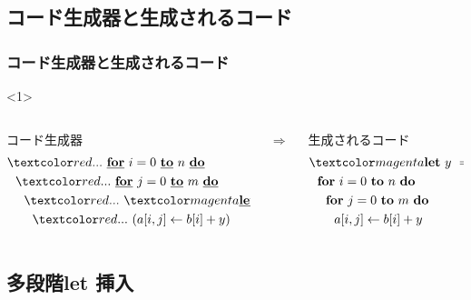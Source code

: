 \subsection{コード生成器と生成されるコード}
\begin{frame}
  \frametitle{コード生成器と生成されるコード}

  \begin{onlyenv}<1>
    \begin{columns}
      \begin{column}{0.5\textwidth}%
        コード生成器
        \begin{align*}
          & \red{...}~ \cfordo{i = 0}{n} \\
          & ~~\red{...}~ \cfordo{j = 0}{m} \\
          & ~~~~\red{...}~ \magenta{\cLet~y=t~\cIn} \\
          & ~~~~~~\red{...}~ (\aryset{a}{i,j}{b[i] + y})
        \end{align*}
      \end{column}
      $\Rightarrow$
      \begin{column}{0.5\textwidth}%
        生成されるコード
        \begin{align*}
          & \magenta{\Let ~y ~= ~t ~\In} \\
          & ~~\fordo{i = 0}{n} \\
          & ~~~~\fordo{j = 0}{m} \\
          & ~~~~~~\aryset{a}{i,j}{b[i] + y}
        \end{align*}
      \end{column}
    \end{columns}
  \end{onlyenv}
\end{frame}



\subsection{多段階let 挿入}

